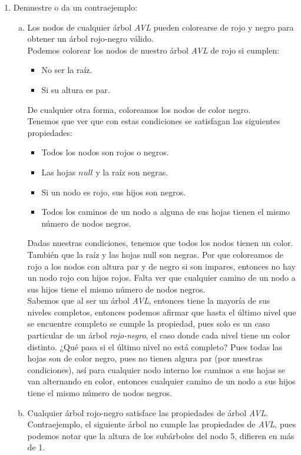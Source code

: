 \documentclass[spanish,12pt,letterpaper]{article}
\begin{document}
\begin{enumerate}
\item Demuestre o da un contraejemplo:
  \begin{enumerate}[a)]
  \item Los nodos de cualquier árbol \textit{AVL} pueden colorearse de rojo y
    negro para obtener un árbol rojo-negro válido.\\
    Podemos colorear los nodos de nuestro árbol \textit{AVL} de rojo si cumplen:
    \begin{itemize}
    \item No ser la raíz.
    \item Si su altura es par.
    \end{itemize}
    De cualquier otra forma, coloreamos los nodos de color negro.\\
    Tenemos que ver que con estas condiciones se satisfagan las siguientes
    propiedades:
    \begin{itemize}
    \item Todos los nodos son rojos o negros.
    \item Las hojas $null$  y la raíz son negras.
    \item Si un nodo es rojo, sus hijos son negros.
    \item Todos los caminos de un nodo a alguna de sus hojas tienen el mismo
      número de nodos negros.
    \end{itemize}
    Dadas nuestras condiciones, tenemos que todos los nodos tienen un color.
    También que la raíz y las hojas null son negras. Por que coloreamos de rojo a
    los nodos con altura par y de negro si son impares, entonces no hay un nodo
    rojo con hijos rojos. Falta ver que cualquier camino de un nodo a sus hijos
    tiene el mismo número de nodos negros.\\
    Sabemos que al ser un árbol \textit{AVL}, entonces tiene la mayoría de sus
    niveles completos, entonces podemos afirmar que hasta el último nivel que se
    encuentre completo se cumple la propiedad, pues solo es un caso particular de
    un árbol \textit{rojo-negro}, el caso donde cada nivel tiene un color
    distinto. ¿Qué pasa si el último nivel no está completo? Pues todas las hojas
    son de color negro, pues no tienen algura par (por nuestras condiciones), así
    para cualquier nodo interno los caminos a sus hojas se van alternando en
    color, entonces cualquier camino de un nodo a sus hijos tiene el mismo número
    de nodos negros.
  \item Cualquier árbol rojo-negro satisface las propiedades de árbol
    \textit{AVL}.\\
    Contraejemplo, el siguiente árbol no cumple las propiedades de \textit{AVL},
    pues podemos notar que la altura de los subárboles del nodo 5, difieren en
    más de 1.\\ 
    

\end{enumerate}
\end{enumerate}
\end{document}
